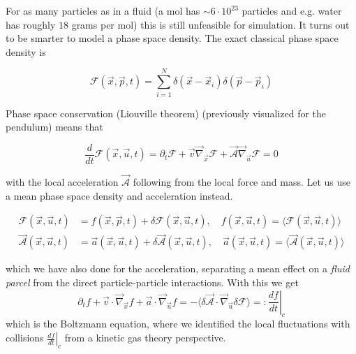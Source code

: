 For as many particles as in a fluid (a mol has $\sim 6\cdot10^{23}$ particles and e.g. water has roughly $18$ grams per mol) this is still unfeasible for simulation.
It turns out to be smarter to model a phase space density. The exact classical phase space density is

\begin{equation}
    \mathcal{F}(\vec{x},\vec{p},t) = \sum_{i=1}^{N} \delta (\vec{x} - \vec{x}_i) \delta (\vec{p} - \vec{p}_i)
\end{equation}

Phase space conservation (Liouville theorem) (previously visualized for the pendulum) means that

\begin{equation}
    \frac{d}{dt} \mathcal{F}(\vec{x},\vec{u},t) = \partial_t \mathcal{F} + \vec{v} \vec{\nabla}_\vec{x} \mathcal{F} + \vec{\mathcal{A}} \vec{\nabla}_\vec{u} \mathcal{F} = 0
\end{equation}

with the local acceleration $\vec{\mathcal{A}}$ following from the local force and mass. Let us use a mean phase space density and acceleration instead.

\begin{equation}
    \begin{aligned}
        \mathcal{F}(\vec{x},\vec{u},t) &= f(\vec{x},\vec{p},t) + \delta \mathcal{F}(\vec{x},\vec{u},t), \quad f(\vec{x},\vec{u},t) = \langle \mathcal{F}(\vec{x},\vec{u},t) \rangle \\
        \vec{\mathcal{A}}(\vec{x},\vec{u},t) &= \vec{a}(\vec{x},\vec{u},t) + \delta \vec{\mathcal{A}}(\vec{x},\vec{u},t), \quad \vec{a}(\vec{x},\vec{u},t) = \langle \vec{\mathcal{A}}(\vec{x},\vec{u},t) \rangle
    \end{aligned}
\end{equation}

which we have also done for the acceleration, separating a mean effect on a \textit{fluid parcel} from the direct particle-particle interactions. With this we
get
\begin{equation}
    \label{eq:boltzmann1}
    \partial_t f + \vec{v}\cdot \vec{\nabla}_{\vec{x}}f + \vec{a} \cdot \vec{\nabla}_{\vec{u}}f = -\langle \delta \vec{\mathcal{A}} \cdot \vec{\nabla}_{\vec{u}} \delta \mathcal{F} \rangle =: \left. \frac{df}{dt} \right|_c
\end{equation}
which is the Boltzmann equation, where we identified the local fluctuations with collisions $\left. \frac{df}{dt} \right|_c$ from a kinetic gas theory perspective.

